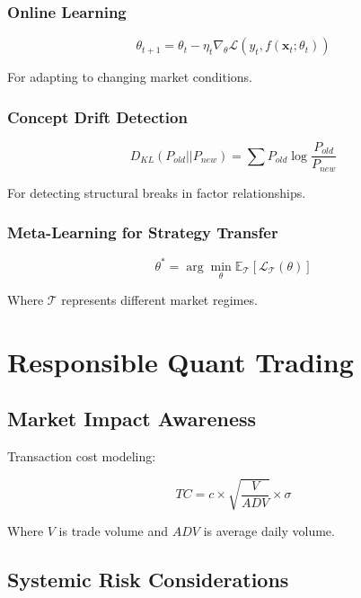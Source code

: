 \documentclass[11pt,letterpaper]{book}
\newcommand{\E}{\mathbb{E}}
\begin{document}
\subsubsection{Online Learning}

\begin{equation}
\theta_{t+1} = \theta_t - \eta_t \nabla_\theta \mathcal{L}(y_t, f(\mathbf{x}_t; \theta_t))
\end{equation}

For adapting to changing market conditions.

\subsubsection{Concept Drift Detection}

\begin{equation}
D_{KL}(P_{old} || P_{new}) = \sum P_{old} \log \frac{P_{old}}{P_{new}}
\end{equation}

For detecting structural breaks in factor relationships.

\subsubsection{Meta-Learning for Strategy Transfer}

\begin{equation}
\theta^* = \arg\min_\theta \E_{\mathcal{T}} [\mathcal{L}_\mathcal{T}(\theta)]
\end{equation}

Where $\mathcal{T}$ represents different market regimes.

\section{Responsible Quant Trading}

\subsection{Market Impact Awareness}

Transaction cost modeling:

\begin{equation}
TC = c \times \sqrt{\frac{V}{ADV}} \times \sigma
\end{equation}

Where $V$ is trade volume and $ADV$ is average daily volume.

\subsection{Systemic Risk Considerations}
\end{document}
